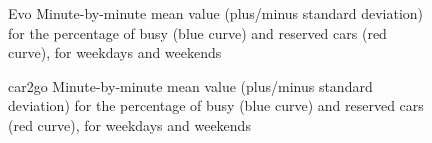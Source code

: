 \begin{figure}
	\centering
	\qquad
	\caption{Evo Minute-by-minute mean value (plus/minus standard deviation) for  the  percentage of busy (blue curve) and reserved cars (red curve), for weekdays and weekends}
	\label{fig:4_4_evo_busy}%
\end{figure}

\begin{figure}
	\centering
	\qquad
	\caption{car2go Minute-by-minute mean value (plus/minus standard deviation) for  the  percentage of busy (blue curve) and reserved cars (red curve), for weekdays and weekends}
	\label{fig:4_4_c2g_busy}%
\end{figure}


